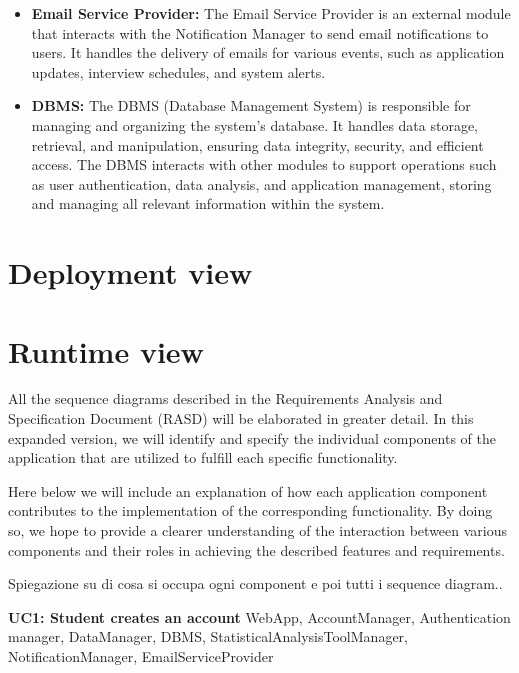 \begin{itemize}
    \item \textbf{Email Service Provider:} The Email Service Provider is an external module that interacts with the Notification Manager to send email notifications to users. It handles the delivery of emails for various events, such as application updates, interview schedules, and system alerts.
    \item \textbf{DBMS:} The DBMS (Database Management System) is responsible for managing and organizing the system's database. It handles data storage, retrieval, and manipulation, ensuring data integrity, security, and efficient access. The DBMS interacts with other modules to support operations such as user authentication, data analysis, and application management, storing and managing all relevant information within the system.
    
\end{itemize}

\section{Deployment view}

\section{Runtime view}

All the sequence diagrams described in the Requirements Analysis and Specification Document (RASD) will be elaborated in greater detail. In this expanded version, we will identify and specify the individual components of the application that are utilized to fulfill each specific functionality. 

Here below we will include an explanation of how each application component contributes to the implementation of the corresponding functionality. By doing so, we hope to provide a clearer understanding of the interaction between various components and their roles in achieving the described features and requirements.

Spiegazione su di cosa si occupa ogni component e poi tutti i sequence diagram..

\textbf{UC1: Student creates an account}
WebApp, AccountManager, Authentication manager, DataManager, DBMS, StatisticalAnalysisToolManager, NotificationManager, EmailServiceProvider

